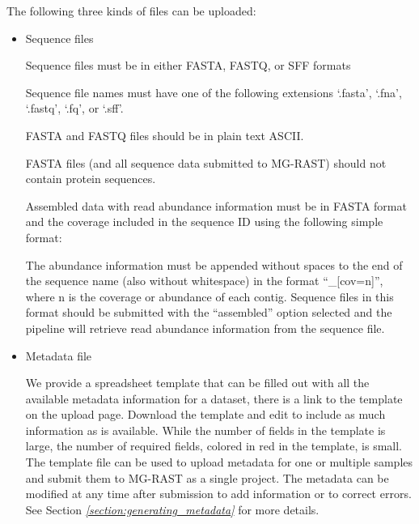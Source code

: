 \documentclass[letterpaper,10pt,english]{sphinxmanual}
\begin{document}
The following three kinds of files can be uploaded:
\begin{itemize}
\item {} 
Sequence files

Sequence files must be in either FASTA, FASTQ, or SFF formats

Sequence file names must have one of the following extensions \textendash{}
‘.fasta’, ‘.fna’, ‘.fastq’, ‘.fq’, or ‘.sff’.

FASTA and FASTQ files should be in plain text ASCII.

FASTA files (and all sequence data submitted to MG-RAST) should not
contain protein sequences.

Assembled data with read abundance information must be in FASTA
format and the coverage included in the sequence ID using the
following simple format:

\begin{sphinxVerbatim}[commandchars=\\\{\}]
\PYG{p}{[}\PYG{p}{]}
\PYG{p}{[}\PYG{p}{]}
\end{sphinxVerbatim}

The abundance information must be appended without spaces to the end
of the sequence name (also without whitespace) in the format
“\_{[}cov=n{]}”, where n is the coverage or abundance of each contig.
Sequence files in this format should be submitted with the
“assembled” option selected and the pipeline will retrieve read
abundance information from the sequence file.

\item {} 
Metadata file

We provide a spreadsheet template that can be filled out with all the
available metadata information for a dataset, there is a link to the
template on the upload page. Download the template and edit to
include as much information as is available. While the number of
fields in the template is large, the number of required fields,
colored in red in the template, is small. The template file can be
used to upload metadata for one or multiple samples and submit them
to MG-RAST as a single project. The metadata can be modified at any
time after submission to add information or to correct errors. See
Section
{\hyperref[\detokenize{faq:section:generating_metadata}]{\emph{{[}section:generating\_metadata{]}}}} for
more details.


\end{itemize}
\end{document}
